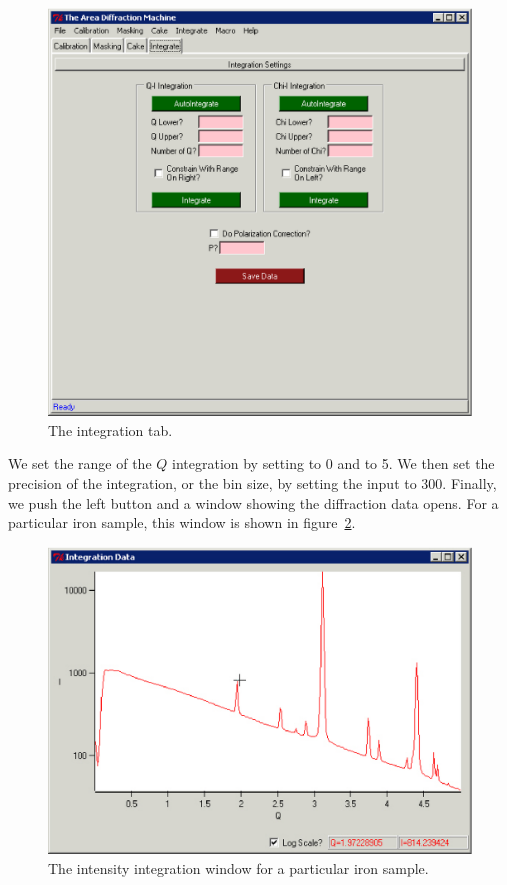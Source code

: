 \begin{figure}
    \centering
    \includegraphics[scale=.75]{figures/integration_tab.eps}
    \caption{The integration tab.}
    \label{integration_tab_example}
\end{figure}

We set the range of the $Q$ integration by setting
 to 0 and  to 5. We
then set the precision of the integration, or the
bin size, by setting the  input
to 300. Finally, we push the left 
button and a window showing the diffraction data
opens. For a particular iron sample, this window
is shown in figure~\ref{iron_intensity}.

\begin{figure}
    \centering
    \includegraphics[scale=.75]{figures/iron_intensity.eps}
    \caption{The intensity integration window for 
    a particular iron sample.}
    \label{iron_intensity}
\end{figure}


